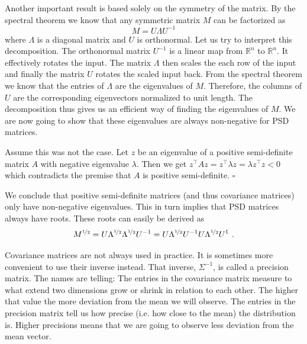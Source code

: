 Another important result is based solely on the symmetry of the matrix. By the spectral theorem we know that any symmetric matrix $ M $ can be factorized as
\begin{equation}\label{eq:eigenvalueDecomp}
M = U \Lambda U^{-1}
\end{equation}
where $ \Lambda $ is a diagonal matrix and $ U $ is orthonormal. Let us try to interpret this decomposition. The orthonormal matrix $ U^{-1} $ is a linear map from
$ \mathbb{R}^{n} $ to $ \mathbb{R}^{n} $. It effectively rotates the input. The matrix $ \Lambda $ then scales the each row of the input and finally the matrix
$ U $ rotates the scaled input back. From the spectral theorem we know that the entries of $ \Lambda $ are the eigenvalues of $ M $. Therefore, the columns of $ U $
are the corresponding eigenvectors normalized to unit length. The decomposition thus gives us an efficient way of finding the eigenvalues of $ M $. We are now going
to show that these eigenvalues are always non-negative for PSD matrices.

\begin{Lemma}
Assume this was not the case. Let $ z $ be an eigenvalue of a positive 
semi-definite matrix $ A $ with negative eigenvalue $ \lambda $. Then we get $ z^{\top}Az = z^{\top}\lambda z = \lambda z^{\top} z < 0 $ which contradicts the
premise that $ A $ is positive semi-definite. $ \square $
\end{Lemma}

We conclude that positive semi-definite matrices (and thus covariance matrices) only have non-negative eigenvalues.
This in turn implies that PSD matrices always have roots. These roots can easily be derived as 
\begin{equation}\label{eq:PSDRoots}
M^{\nicefrac{1}{2}} = U \Lambda^{\nicefrac{1}{2}}\Lambda^{\nicefrac{1}{2}} U^{-1} = U \Lambda^{\nicefrac{1}{2}}U^{-1} U \Lambda^{\nicefrac{1}{2}} U^{1} \ .
\end{equation} 

Covariance matrices are not always used in practice. It is sometimes more convenient to use their inverse instead. That inverse, $ \Sigma^{-1} $, is called a precision
matrix. The names are telling: The entries in the covariance matrix measure to what extend two dimensions grow or shrink in relation to each other. The higher
that value the more deviation from the mean we will observe. 
The entries in the precision matrix tell us how precise (i.e. how close to the mean) the distribution is. Higher
precisions means that we are going to observe less deviation from the mean vector.

